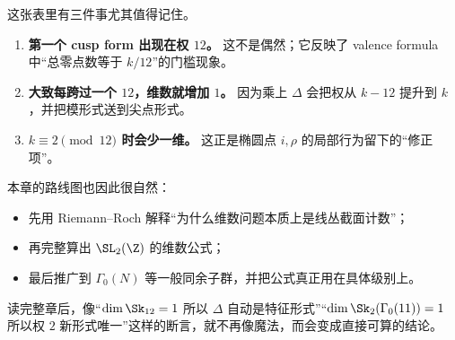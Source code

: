 

这张表里有三件事尤其值得记住。
\begin{enumerate}
  \item \textbf{第一个 cusp form 出现在权 $12$。} 这不是偶然；它反映了 valence formula 中“总零点数等于 $k/12$”的门槛现象。
  \item \textbf{大致每跨过一个 $12$，维数就增加 $1$。} 因为乘上 $\Delta$ 会把权从 $k-12$ 提升到 $k$，并把模形式送到尖点形式。
  \item \textbf{$k\equiv 2\pmod{12}$ 时会少一维。} 这正是椭圆点 $i,\rho$ 的局部行为留下的“修正项”。
\end{enumerate}

本章的路线图也因此很自然：
\begin{itemize}
  \item 先用 Riemann--Roch 解释“为什么维数问题本质上是线丛截面计数”；
  \item 再完整算出 $\SL_2(\Z)$ 的维数公式；
  \item 最后推广到 $\Gamma_0(N)$ 等一般同余子群，并把公式真正用在具体级别上。
\end{itemize}

读完整章后，像“$\dim \Sk_{12}=1$ 所以 $\Delta$ 自动是特征形式”“$\dim \Sk_2(\Gamma_0(11))=1$ 所以权 $2$ 新形式唯一”这样的断言，就不再像魔法，而会变成直接可算的结论。
